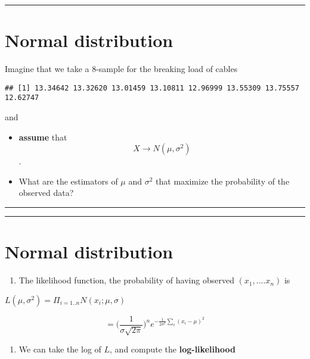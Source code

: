 \documentclass[
]{book}
\providecommand{\tightlist}{%
  \setlength{\itemsep}{0pt}\setlength{\parskip}{0pt}}
\begin{document}
\begin{center}\rule{0.5\linewidth}{0.5pt}\end{center}

\hypertarget{normal-distribution-9}{%
\section{Normal distribution}\label{normal-distribution-9}}

Imagine that we take a \(8\)-sample for the breaking load of cables

\begin{verbatim}
## [1] 13.34642 13.32620 13.01459 13.10811 12.96999 13.55309 13.75557 12.62747
\end{verbatim}

and

\begin{itemize}
\item
  \textbf{assume} that \[X \rightarrow N(\mu, \sigma^2)\].
\item
  What are the estimators of \(\mu\) and \(\sigma^2\) that maximize the probability of the observed data?
\end{itemize}

\begin{center}\rule{0.5\linewidth}{0.5pt}\end{center}

\begin{center}\rule{0.5\linewidth}{0.5pt}\end{center}

\hypertarget{normal-distribution-10}{%
\section{Normal distribution}\label{normal-distribution-10}}

\begin{enumerate}
\def\labelenumi{\arabic{enumi}.}
\tightlist
\item
  The likelihood function, the probability of having observed \((x_1, ....x_n)\) is
\end{enumerate}

\(L(\mu, \sigma^2)=\Pi_{i=1..n} N(x_i;\mu,\sigma)\)

\[=\big( \frac{1}{\sigma \sqrt{2 \pi}}\big)^n e^{-\frac{1}{2\sigma^2} \sum_i(x_i-\mu)^2}\]

\begin{enumerate}
\def\labelenumi{\arabic{enumi}.}
\setcounter{enumi}{1}
\tightlist
\item
  We can take the log of \(L\), and compute the \textbf{log-likelihood}
\end{enumerate}
\end{document}

